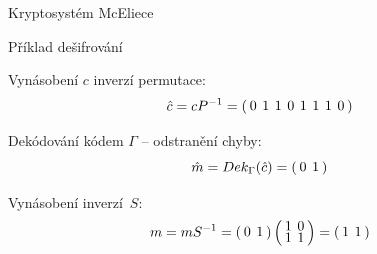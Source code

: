 \documentclass{beamer}
\begin{document}
\begin{frame}{Kryptosystém McEliece}

    \begin{exampleblock}{Příklad dešifrování}

        Vynásobení $c$ inverzí permutace:
        $$
        \arraycolsep=2pt
        \def\arraystretch{0.5}
            \hat{c} = c P^{-1} = \left(
                \begin{array}{*{8}{c}}
                    0 & 1 & 1 & 0 & 1 & 1 & 1 & 0 \\
                \end{array}
            \right)
        $$

        Dekódování kódem $\Gamma$ -- odstranění chyby:
        $$
        \arraycolsep=2pt
        \def\arraystretch{0.5}
            \hat{m} = Dek_{\Gamma}(\hat{c}) = \left(
                \begin{array}{*{2}{c}}
                    0 & 1 \\
                \end{array}
            \right)
        $$

        Vynásobení inverzí~$S$:
        $$
        \arraycolsep=2pt
        \def\arraystretch{0.5}
            m = m S^{-1} = \left(
                \begin{array}{*{2}{c}}
                    0 & 1 \\
                \end{array}
            \right) \left(
                \begin{array}{*{2}{c}}
                    1 & 0 \\
                    1 & 1 \\
                \end{array}
            \right) = \left(
                \begin{array}{*{2}{c}}
                    1 & 1 \\
                \end{array}
            \right)
        $$

    \end{exampleblock}

\end{frame}
\end{document}

